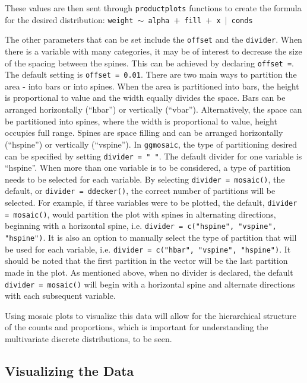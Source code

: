 These values are then sent through \texttt{productplots} functions to
create the formula for the desired distribution:
\texttt{weight $\sim$ alpha $+$ fill $+$ x $|$ conds }

The other parameters that can be set include the \texttt{offset} and the
\texttt{divider}. When there is a variable with many categories, it may
be of interest to decrease the size of the spacing between the spines.
This can be achieved by declaring \texttt{offset =}. The default setting
is \texttt{offset = 0.01}. There are two main ways to partition the area
- into bars or into spines. When the area is partitioned into bars, the
height is proportional to value and the width equally divides the space.
Bars can be arranged horizontally (``hbar'') or vertically (``vbar'').
Alternatively, the space can be partitioned into spines, where the width
is proportional to value, height occupies full range. Spines are space
filling and can be arranged horizontally (``hspine'') or vertically
(``vspine''). In \texttt{ggmosaic}, the type of partitioning desired can
be specified by setting \texttt{divider = " "}. The default divider for
one variable is ``hspine''. When more than one variable is to be
considered, a type of partition needs to be selected for each variable.
By selecting \texttt{divider = mosaic()}, the default, or
\texttt{divider = ddecker()}, the correct number of partitions will be
selected. For example, if three variables were to be plotted, the
default, \texttt{divider = mosaic()}, would partition the plot with
spines in alternating directions, beginning with a horizontal spine,
i.e. \texttt{divider = c("hspine", "vspine", "hspine")}. It is also an
option to manually select the type of partition that will be used for
each variable, i.e. \texttt{divider = c("hbar", "vspine", "hspine")}. It
should be noted that the first partition in the vector will be the last
partition made in the plot. As mentioned above, when no divider is
declared, the default \texttt{divider = mosaic()} will begin with a
horizontal spine and alternate directions with each subsequent variable.

Using mosaic plots to visualize this data will allow for the
hierarchical structure of the counts and proportions, which is important
for understanding the multivariate discrete distributions, to be seen.

\subsection{Visualizing the Data}\label{visualizing-the-data}

